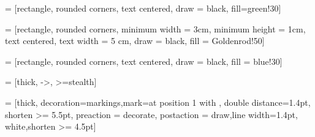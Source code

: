  = [rectangle, rounded corners, text centered, draw = black, fill=green!30]

 = [rectangle, rounded corners, minimum width = 3cm, minimum height = 1cm, text centered, text width = 5 cm, draw = black, fill = Goldenrod!50]

 = [rectangle, rounded corners, text centered, draw = black, fill = blue!30]

 = [thick, ->, >=stealth]

 = [thick, decoration={markings,mark=at position
   1 with {}},
   double distance=1.4pt, shorten >= 5.5pt,
   preaction = {decorate},
   postaction = {draw,line width=1.4pt, white,shorten >= 4.5pt}]

\usepackage{caption}
\usepackage{subcaption}
